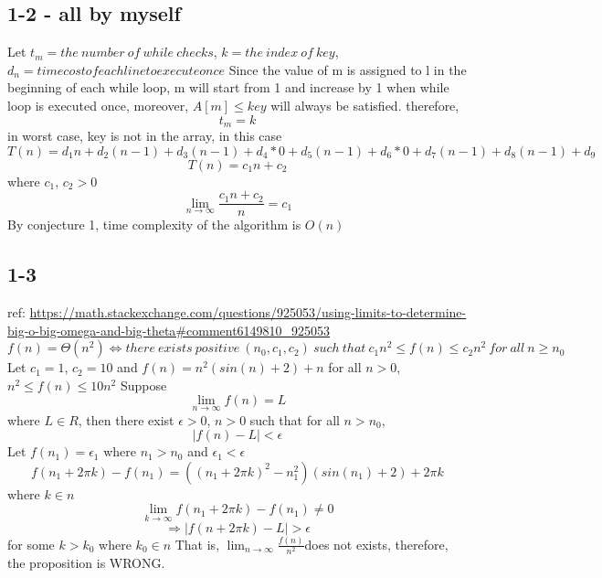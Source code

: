 \documentclass[12pt]{article}
\begin{document}
\subsection*{1-2 - all by myself}
Let $t_m = the\ number\ of\ while\ checks$, $k = the\ index\ of\ key$, $d_n = time cost of each line to execute once$\newline
Since the value of m is assigned to l in the beginning of each while loop, m will start from 1 and increase by 1 when while loop is executed once, moreover, $A[m] \leq key$ will always be satisfied.\newline
therefore,
\[t_m = k\]
in worst case, key is not in the array, in this case
\[T(n) = d_1n + d_2(n-1) + d_3(n-1) + d_4 * 0 + d_5(n-1) + d_6 * 0 + d_7(n-1) + d_8(n-1) + d_9\]
\[T(n) = c_1n + c_2\]
where $c_1$, $c_2 > 0$
\[\lim_{n \to \infty} {\frac{c_1n + c_2}{n}} = c_1\]
By conjecture 1, time complexity of the algorithm is $O(n)$
\subsection*{1-3}
ref: \url{https://math.stackexchange.com/questions/925053/using-limits-to-determine-big-o-big-omega-and-big-theta#comment6149810_925053}\newline
\[f(n)=\Theta(n^2)\Longleftrightarrow there\ exists\ positive\ (n_0, c_1, c_2)\ such\ that\ c_1n^2\leq f(n)\leq c_2n^2\ for\ all\ n\geq n_0\]
Let \(c_1 = 1\), \(c_2 = 10\) and \(f(n) = n^2(sin(n) + 2) + n\)\newline
for all \(n > 0\), \(n^2  \leq f(n) \leq 10n^2\)\newline
Suppose
\[\lim_{n \to \infty} {f(n)} = L\]
where $L \in R$, then there exist $\epsilon > 0$, $n > 0$ such that for all $n > n_0$,
\[|f(n)-L|<\epsilon\]
Let $f(n_1) = \epsilon_1$ where $n_1 > n_0$ and $\epsilon_1 < \epsilon$
\[f(n_1 + 2\pi k) - f(n_1) = ((n_1+2\pi k)^2-n_1^2)(sin(n_1) + 2) + 2\pi k\]
where $k \in n$
\[\lim_{k \to \infty}{f(n_1 + 2\pi k) - f(n_1)} \neq 0\]
\[\Rightarrow |f(n+2\pi k) - L| > \epsilon\]
for some $k > k_0$  where $k_0 \in n$\newline
That is, $\lim_{n \to \infty} {\frac{f(n)}{n^2}} $does not exists, therefore, the proposition is WRONG.
\end{document}

